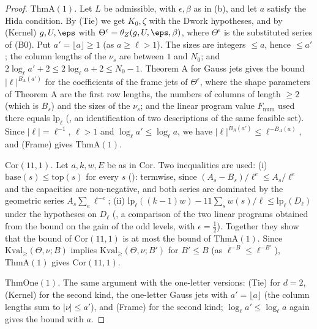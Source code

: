 \begin{proof}
\emph{$\mathrm{ThmA}(1)$.} Let $L$ be admissible, with $\epsilon,\beta$ as in (b), and let $a$ satisfy the Hida condition.
By (Tie) we get $K_0,\zeta$ with the Dwork hypotheses, and by (Kernel) $g,U,\eps$ with $\Theta^\epsilon=\theta_Z(g,U,\eps,\beta)$,
where $\Theta^\epsilon$ is the substituted series of (B0). Put $a'=\lfloor a\rfloor\ge1$ (as $a\ge\ell>1$). The sizes are
integers $\le a$, hence $\le a'$; the column lengths of the $\nu_s$ are between $1$ and $N_0$; and $2\log_\ell a'+2\le
2\log_\ell a+2\le N_0-1$. Theorem A for Gauss jets gives the bound $|\ell|^{B_A(a')}$ for the coefficients of the frame jets
of $\Theta^\epsilon$, where the shape parameters of Theorem A are the first row lengths, the numbers of columns of length
$\ge2$ (which is $B_s$) and the sizes of the $\nu_s$; and the linear program value $F_{\mathrm{num}}$ used there equals
$\mathrm{lp}_\ell$ (, an identification of two
descriptions of the same feasible set). Since $|\ell|=\ell^{-1}$, $\ell>1$ and $\log_\ell a'\le\log_\ell a$, we have
$|\ell|^{B_A(a')}\le\ell^{-B_A(a)}$, and (Frame) gives $\mathrm{ThmA}(1)$.

\emph{$\mathrm{Cor}(11,1)$.} Let $a,k,w,E$ be as in $\mathrm{Cor}$. Two inequalities are used:
(i) $\mathrm{base}(s)\le\mathrm{top}(s)$ for every $s$
(): termwise, since
$(A_s-B_s)/\ell^e\le A_s/\ell^e$ and the capacities are non-negative, and both series are dominated by the geometric series
$A_s\sum_e\ell^{-e}$;
(ii) $\mathrm{lp}_\ell((k-1)w)-11\sum_sw(s)/\ell\le\mathrm{lp}_\ell(D_\ell)$ under the hypotheses on $D_\ell$
(, a comparison of the
two linear programs obtained from the bound  on the
gain of the odd levels, with $\epsilon=\frac12$).
Together they show that the bound of $\mathrm{Cor}(11,1)$ is at most the bound of $\mathrm{ThmA}(1)$. Since
$\mathrm{Kval}_\ge(\Theta,\nu;B)$ implies $\mathrm{Kval}_\ge(\Theta,\nu;B')$ for $B'\le B$ (as $\ell^{-B}\le\ell^{-B'}$),
$\mathrm{ThmA}(1)$ gives $\mathrm{Cor}(11,1)$.

\emph{$\mathrm{ThmOne}(1)$.} The same argument with the one-letter versions: (Tie) for $d=2$, (Kernel) for the second kind,
the one-letter Gauss jets with $a'=\lfloor a\rfloor$ (the column lengths sum to $|\nu|\le a'$), and (Frame) for the second
kind; $\log_\ell a'\le\log_\ell a$ again gives the bound with $a$.
\end{proof}

